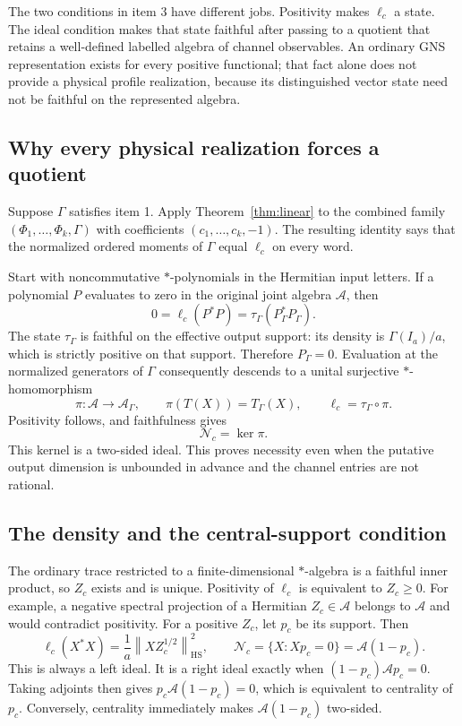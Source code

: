 \documentclass[11pt,a4paper]{article}
\theoremstyle{definition}\newtheorem{definition}[theorem]{Definition}
\newcommand{\Alg}{\mathcal A}
\newcommand{\Nul}{\mathcal N}
\newcommand{\norm}[1]{\left\lVert #1\right\rVert}
\begin{document}
The two conditions in item 3 have different jobs. Positivity makes $\ell_c$ a state. The ideal condition makes that state faithful after passing to a quotient that retains a well-defined labelled algebra of channel observables. An ordinary GNS representation exists for every positive functional; that fact alone does not provide a physical profile realization, because its distinguished vector state need not be faithful on the represented algebra.

\subsection{Why every physical realization forces a quotient}

Suppose $\Gamma$ satisfies item 1. Apply Theorem~\ref{thm:linear} to the combined family $(\Phi_1,\ldots,\Phi_k,\Gamma)$ with coefficients $(c_1,\ldots,c_k,-1)$. The resulting identity says that the normalized ordered moments of $\Gamma$ equal $\ell_c$ on every word.

Start with noncommutative $*$-polynomials in the Hermitian input letters. If a polynomial $P$ evaluates to zero in the original joint algebra $\Alg$, then
\[
 0=\ell_c(P^*P)=\tau_\Gamma(P_\Gamma^*P_\Gamma).
\]
The state $\tau_\Gamma$ is faithful on the effective output support: its density is $\Gamma(I_a)/a$, which is strictly positive on that support. Therefore $P_\Gamma=0$. Evaluation at the normalized generators of $\Gamma$ consequently descends to a unital surjective $*$-homomorphism
\[
 \pi:\Alg\longrightarrow\Alg_\Gamma,\qquad
 \pi(T(X))=T_\Gamma(X),\qquad \ell_c=\tau_\Gamma\circ\pi.
\]
Positivity follows, and faithfulness gives
\[
 \Nul_c=\ker\pi.
\]
This kernel is a two-sided ideal. This proves necessity even when the putative output dimension is unbounded in advance and the channel entries are not rational.

\subsection{The density and the central-support condition}

The ordinary trace restricted to a finite-dimensional $*$-algebra is a faithful inner product, so $Z_c$ exists and is unique. Positivity of $\ell_c$ is equivalent to $Z_c\ge0$. For example, a negative spectral projection of a Hermitian $Z_c\in\Alg$ belongs to $\Alg$ and would contradict positivity. For a positive $Z_c$, let $p_c$ be its support. Then
\[
 \ell_c(X^*X)=\frac1a\norm{XZ_c^{1/2}}_{\mathrm{HS}}^2,
 \qquad
 \Nul_c=\{X:Xp_c=0\}=\Alg(1-p_c).
\]
This is always a left ideal. It is a right ideal exactly when $(1-p_c)\Alg p_c=0$. Taking adjoints then gives $p_c\Alg(1-p_c)=0$, which is equivalent to centrality of $p_c$. Conversely, centrality immediately makes $\Alg(1-p_c)$ two-sided.
\end{document}
